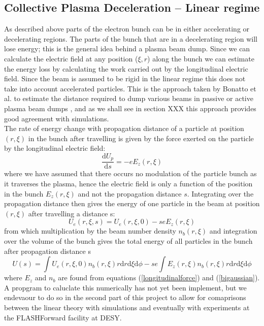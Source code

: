 \subsection{Collective Plasma Deceleration -- Linear regime }
As described above parts of the electron bunch can be in either accelerating or decelerating regions. The parts of the bunch that are in a decelerating region will lose energy; this is the general idea behind a plasma beam dump. Since we can calculate the electric field at any position ($\xi,r$) along the bunch we can estimate the energy loss by calculating the work carried out by the longitudinal electric field. Since the beam is assumed to be rigid in the linear regime this does not take into account accelerated particles. This is the approach taken by Bonatto et al. to estimate the distance required to dump various beams in passive or active plasma beam dumps \citep{Bonatto2016}, and as we shall see in section XXX this approach provides good agreement with simulations.\\
The rate of energy change with propagation distance of a particle at position $(r,\xi)$ in the bunch after travelling is given by the force exerted on the particle by the longitudinal electric field:
\begin{equation}
\frac{\mathrm{d}U_p}{\mathrm{d}s}=-eE_z(r,\xi)
\end{equation}
where we have assumed that there occurs no modulation of the particle bunch as it traverses the plasma, hence the electric field is only a function of the position in the bunch $E_z(r,\xi)$ and not the propagation distance $s$. Integrating over the propagation distance then gives the energy of one particle in the beam at position $(r,\xi)$ after travelling a distance s:
\begin{equation}
U_e(r,\xi,s)=U_e(r,\xi,0)-seE_z(r,\xi)
\end{equation}
from which multiplication by the beam number density $n_b(r,\xi)$ and integration over the volume of the bunch gives the total energy of all particles in the bunch after propagation distance s
\begin{equation}
U(s)=\int  U_e(r,\xi,0)n_b(r,\xi)r\mathrm{d}r\mathrm{d}\xi\mathrm{d}\phi-se\int E_z(r,\xi)n_b(r,\xi)r\mathrm{d}r\mathrm{d}\xi\mathrm{d}\phi
\label{energy_loss_bonatto}
\end{equation}
where $E_z$ and $n_b$ are found from equations (\ref{longitudinalforce}) and (\ref{bigaussian}). A propgram to caluclate this numerically has not yet been implement, but we endevaour to do so in the second part of this project to allow for comaprisons between the linear theory with simulations and eventually with experiments at the FLASHForward facility at DESY.
